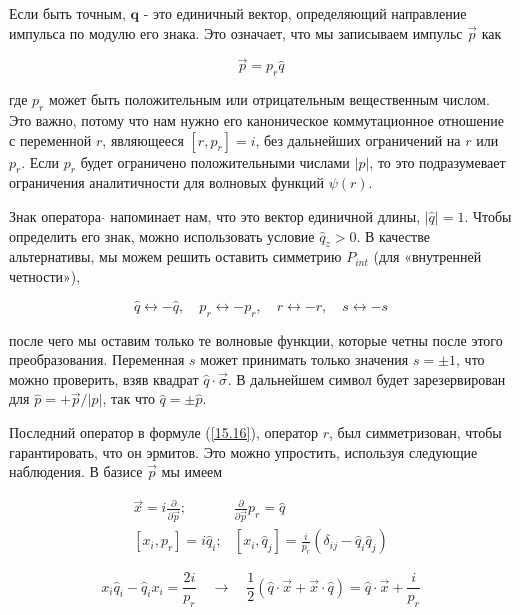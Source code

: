 \documentclass[main.tex]{subfiles}
\begin{document}
Если быть точным, $\mathbf{q}$ - это единичный вектор, определяющий направление импульса по модулю его знака. Это означает, что мы записываем импульс $\vec p$ как

\begin{equation}\label{15.17}
	\vec p = p_r \hat q
\end{equation}

где $p_r$ может быть положительным или отрицательным вещественным числом. Это важно, потому что нам нужно его каноническое коммутационное отношение с переменной $r$, являющееся $[r, p_r] = i$, без дальнейших ограничений на $r$ или $p_r$. Если $p_r$ будет ограничено положительными числами $|p|$, то это подразумевает ограничения аналитичности для волновых функций $\psi(r)$.

Знак оператора $\hat{}$ напоминает нам, что это вектор единичной длины, $|\hat q| = 1$. Чтобы определить его знак, можно использовать условие $\hat q_z >0$. В качестве альтернативы, мы можем решить оставить симметрию $P_{int}$ (для «внутренней четности»),

\begin{equation}\label{15.18}
	\hat{q} \leftrightarrow-\hat{q}, \quad p_{r} \leftrightarrow-p_{r}, \quad r \leftrightarrow-r, \quad s \leftrightarrow-s
\end{equation}

после чего мы оставим только те волновые функции, которые четны после этого преобразования. Переменная $s$ может принимать только значения $s = \pm 1$, что можно проверить, взяв квадрат $\hat q \cdot \vec\sigma$. В дальнейшем символ будет зарезервирован для $\hat p = +\vec p/|p|$, так что $\hat q = \pm\hat p$.

Последний оператор в формуле (\ref{15.16}), оператор $r$, был симметризован, чтобы гарантировать, что он эрмитов. Это можно упростить, используя следующие наблюдения. В базисе $\vec p$ мы имеем

\begin{equation}\label{15.19}
	\begin{aligned} \vec{x}=i \frac{\partial}{\partial \vec{p}} ; \quad & \frac{\partial}{\partial \vec{p}} p_{r}=\hat{q} \\\left[x_{i}, p_{r}\right]=i \hat{q}_{i} ; &\left[x_{i}, \hat{q}_{j}\right]=\frac{i}{p_{r}}\left(\delta_{i j}-\hat{q}_{i} \hat{q}_{j}\right) \end{aligned}
\end{equation}

\begin{equation}\label{15.20}
	x_{i} \hat{q}_{i}-\hat{q}_{i} x_{i}=\frac{2 i}{p_{r}} \quad \rightarrow \quad \frac{1}{2}(\hat{q} \cdot \vec{x}+\vec{x} \cdot \hat{q})=\hat{q} \cdot \vec{x}+\frac{i}{p_{r}}
\end{equation}
\end{document}
